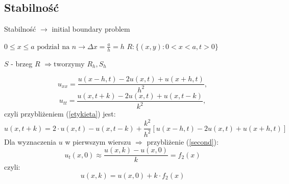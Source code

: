 
\subsection{Stabilność}
\begin{frame}{Stabilność}
$\to$ initial boundary problem

  \begin{block}{}
$0 \le x \le a \text{ podział na } n \to \Delta x = \frac{a}{h} = h$
$R: \{ (x,y): 0 < x< a, t > 0\}$
  \end{block}
$S$ - brzeg $R$
$\Rightarrow \text{tworzymy } R_h, S_h$


\end{frame}

\begin{frame}
$$u_{xx} = \frac{u(x-h,t)-2u(x,t)+u(x+h,t)}{h^2},$$
$$u_{tt} = \frac{u(x,t+k)-2u(x,t)+u(x,t-k)}{k^2},$$
czyli przybliżeniem (\ref{etykieta}) jest: \\
\begin{equation} \label{21} u(x,t+k) = 2\cdot u(x,t) - u(x,t-k) + \frac{k^2}{h^2}[u(x-h,t)-2u(x,t)+u(x+h,t)] \end{equation}
Dla wyznaczenia $u$ w pierwszym wierszu $\Rightarrow$ przybliżenie (\ref{second}):
$$u_t(x,0) \approx \frac{u(x,k) - u(x,0)}{k} = f_2(x)$$
czyli:
\begin{equation} \label{22} u(x,k) = u(x,0) + k \cdot f_2(x) \end{equation}
\end{frame}

